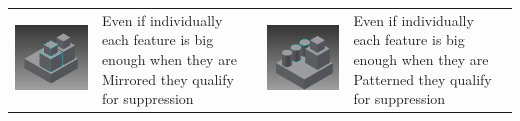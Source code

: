 \begin{longtable}{ | C{0.25\textwidth}  L{0.25\textwidth} || C{0.25\textwidth}  L{0.25\textwidth}|}
\includegraphics[scale=0.236]{..//Common/images//defeat5.png} &
Even if individually each feature is big enough when they are Mirrored they qualify for suppression &
\includegraphics[scale=0.236]{..//Common/images//defeat6.png} &
Even if individually each feature is big enough when they are Patterned they qualify for suppression \\



\end{longtable}
